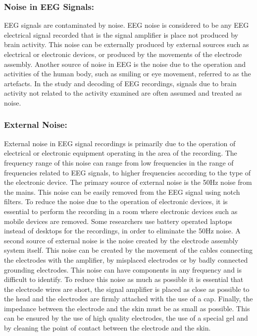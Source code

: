 \subsubsection{\bf{Noise in EEG Signals:}}
EEG signals are contaminated by noise. EEG noise is considered to be any EEG electrical signal recorded that is the signal amplifier is place not produced by brain activity. This noise can be externally produced by external sources such as electrical or electronic devices, or produced by the movements of the electrode assembly. Another source of noise in EEG is the noise due to the operation and activities of the human body, such as smiling or eye movement, referred to as the artefacts. In the study and decoding of EEG recordings, signals due to brain activity not related to the activity examined are often assumed and treated as noise.    

\subsubsection{\bf{External Noise:}}

External noise in EEG signal recordings is primarily due to the operation of electrical or electronic equipment operating in the area of the recording. The frequency range of this noise can range from low frequencies in the range of frequencies related to EEG signals, to higher frequencies according to the type of the electronic device. The primary source of external noise is the 50Hz noise from the mains. This noise can be easily removed from the EEG signal using notch filters. To reduce the noise due to the operation of electronic devices, it is essential to perform the recording in a room where electronic devices such as mobile devices are removed. Some researchers use battery operated laptops instead of desktops for the recordings, in order to eliminate the 50Hz noise. 
A second source of external noise is the noise created by the electrode assembly system itself. This noise can be created by the movement of the cables connecting the electrodes with the amplifier, by misplaced electrodes or by badly connected grounding electrodes. This noise can have components in any frequency and is difficult to identify. To reduce this noise as much as possible it is essential that the electrode wires are short, the signal amplifier is placed as close as possible to the head and the electrodes are firmly attached with the use of a cap. Finally, the impedance between the electrode and the skin must be as small as possible. This can be ensured by the use of high quality electrodes, the use of a special gel and by cleaning the point of contact between the electrode and the skin.     
 
